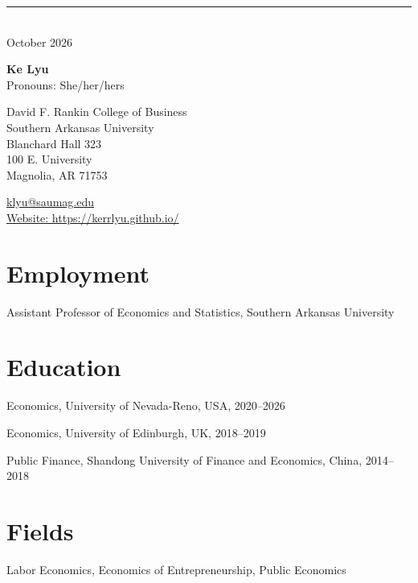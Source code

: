 \documentclass[12pt,letterpaper]{report}
\newcommand{\myname}{Ke Lyu}
\newcommand{\namefont}[1]{{\normalfont\bfseries\Huge{#1}}}
\newcommand{\listitemspace}{0.25em}
\renewenvironment{itemize}
{\begin{list}{}{\setlength{\leftmargin}{0em}
                \setlength{\parskip}{0em}
                \setlength{\itemsep}{\listitemspace}
                \setlength{\parsep}{\listitemspace}}}
{\end{list}}
\begin{document}
    \raggedright{}
    \noindent\rule{\textwidth}{0.4pt} \\ 
    \hfill October 2026 

    \namefont{\myname}\\[0.2em]
    { Pronouns: She/her/hers}

    \vspace{1em}
    \begin{minipage}[t]{0.56\textwidth}
        David F. Rankin College of Business\\
        Southern Arkansas University\\
        Blanchard Hall 323\\
        100 E. University\\
        Magnolia, AR 71753
    \end{minipage}\hfill%
    \begin{minipage}[t]{0.40\textwidth}
        \raggedleft
        \href{mailto:klyu@saumag.edu}{klyu@saumag.edu} \\
        \href{https://kerrlyu.github.io/}{Website: https://kerrlyu.github.io/}
    \end{minipage}

    \section*{Employment}
\begin{tablist} 
\item[2026--] \tab{}Assistant Professor of Economics and Statistics, Southern Arkansas University 
\end{tablist}
    \section*{Education}
    \begin{tablist}
      \item[Ph.D.] \tab{}Economics, University of Nevada-Reno, USA, 2020--2026
      \item[MSc] \tab{}Economics, University of Edinburgh, UK, 2018--2019
      \item[BSc] \tab{}Public Finance, Shandong University of Finance and Economics, China, 2014--2018
      \end{tablist}
    
    \section*{Fields}
    \begin{itemize}
      \item Labor Economics, Economics of Entrepreneurship, Public Economics
    \end{itemize}
    
\end{document}
